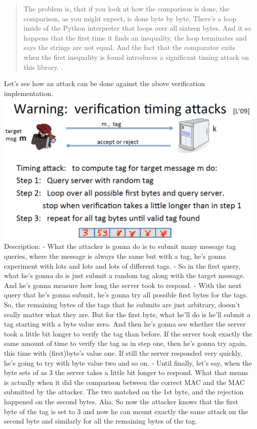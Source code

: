 \documentclass[11pt]{article}
\makeatletter
\def\maxwidth{\ifdim\Gin@nat@width>\linewidth\linewidth
    \else\Gin@nat@width\fi}
\let\Oldincludegraphics\includegraphics
\renewcommand{\includegraphics}[1]{\Oldincludegraphics[width=.8\maxwidth]{#1}}
\makeatother
\begin{document}
\begin{quote}
The problem is, that if you look at how the comparison is done, the
comparison, as you might expect, is done byte by byte. There's a loop
inside of the Python interpreter that loops over all sixteen bytes. And
it so happens that the first time it finds an inequality, the loop
terminates and says the strings are not equal. And the fact that the
comparator exits when the first inequality is found introduces a
significant timing attack on this library. .
\end{quote}

Let's see how an attack can be done against the above verification
implementation. \includegraphics{./Images/VerificationTimingAttacks.png}
Description: - What the attacker is gonna do is to submit many message
tag queries, where the message is always the same but with a tag, he's
gonna experiment with lots and lots and lots of different tags. - So in
the first query, what he's gonna do is just submit a random tag along
with the target message. And he's gonna measure how long the server took
to respond. - With the next query that he's gonna submit, he's gonna try
all possible first bytes for the tags. So, the remaining bytes of the
tags that he submits are just arbitrary, doesn't really matter what they
are. But for the first byte, what he'll do is he'll submit a tag
starting with a byte value zero. And then he's gonna see whether the
server took a little bit longer to verify the tag than before. If the
server took exactly the same amount of time to verify the tag as in step
one, then he's gonna try again, this time with (first)byte's value one.
If still the server responded very quickly, he's going to try with byte
value two and so on. - Until finally, let's say, when the byte sets of
as 3 the server takes a little bit longer to respond. What that means is
actually when it did the comparison between the correct MAC and the MAC
submitted by the attacker. The two matched on the 1st byte, and the
rejection happened on the second bytes. Aha. So now the attacker knows
that the first byte of the tag is set to 3 and now he can mount exactly
the same attack on the second byte and similarly for all the remaining
bytes of the tag.
\end{document}
